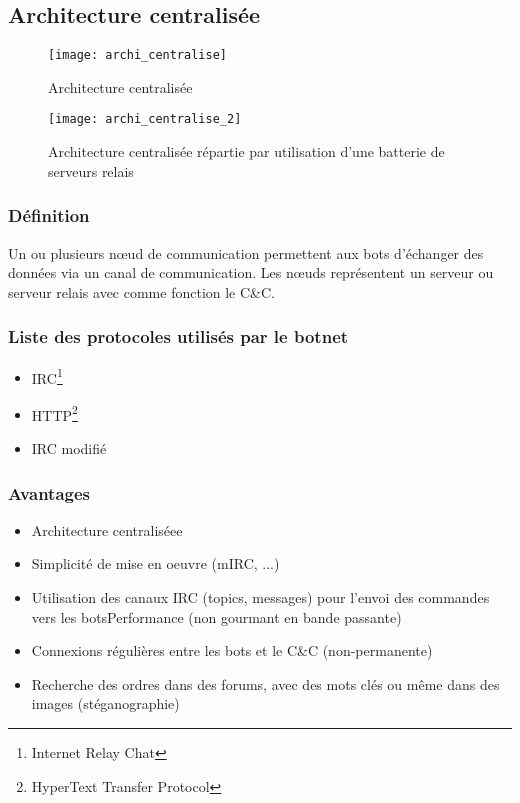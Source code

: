 \subsection[Architecture  centralisée]{Architecture  centralisée}
\begin{figure}[h]
	\centering
		\texttt{[image: archi\_centralise]}
	\label{fig:archi_centralisée}
	\caption[Architecture  centralisée]{Architecture  centralisée}
\end{figure}
\begin{figure}[h]
	\centering
		\texttt{[image: archi\_centralise\_2]}
	\label{fig:Archi_centralisé_2}
	\caption[Architecture  centralisée répartie par utilisation d’une batterie de serveurs relais]{Architecture  centralisée répartie par utilisation d’une batterie de serveurs relais}
\end{figure}

\subsubsection{Définition}
Un ou plusieurs nœud de communication permettent aux bots d'échanger des données via un canal de communication.
Les nœuds représentent un serveur ou serveur relais avec comme fonction le C\&C.

\subsubsection{Liste des protocoles utilisés par le botnet}
\begin{itemize}
	\item IRC\footnote{Internet Relay Chat}
	\item HTTP\footnote{HyperText Transfer Protocol}
	\item IRC modifié
\end{itemize}

\subsubsection{Avantages}
\begin{itemize}
	\item Architecture  centraliséee
	\item Simplicité de mise en oeuvre (mIRC, ...)
	\item Utilisation des canaux IRC (topics, messages) pour l’envoi des commandes vers les botsPerformance (non gourmant en bande passante)
	\item Connexions régulières entre les bots et le C\&C (non-permanente)
	\item Recherche des ordres dans des forums, avec des mots clés ou même dans des images (stéganographie)
\end{itemize}

